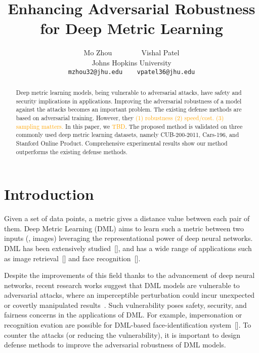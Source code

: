\documentclass[10pt,twocolumn,letterpaper]{article}
\newcommand{\oo}[1]{\textcolor{orange}{#1}}
\begin{document}
\title{Enhancing Adversarial Robustness for Deep Metric Learning}

\author{Mo Zhou ~~~~~~~ Vishal Patel\\
Johns Hopkins University\\
{\tt\small mzhou32@jhu.edu ~~ vpatel36@jhu.edu}
}
\maketitle

\begin{abstract}
	Deep metric learning models, being vulnerable to adversarial
	attacks, have safety and security implications in applications.
	Improving the adversarial robustness of a model against the attacks becomes
	an important problem.
	The existing defense methods are based on adversarial training.
	However, they \oo{(1) robustness (2) speed/cost. (3) sampling matters.}
	In this paper, we \oo{TBD}.
	The proposed method is validated on three commonly
	used deep metric learning datasets, namely CUB-200-2011, Cars-196,
	and Stanford Online Product.
	Comprehensive experimental results show our method outperforms
	the existing defense methods.
\end{abstract}

\section{Introduction}
\label{sec:1}


Given a set of data points, a metric gives a distance value between each pair
of them.
%
Deep Metric Learning (DML) aims to learn such a metric between two inputs (\eg,
images) leveraging the representational power of deep neural networks.
%
DML has been extensively studied~[], and has a wide range of applications such
as image retrieval~[] and face recognition~[].


Despite the improvements of this field thanks to the advancement of deep neural
networks, recent research works suggest that DML models are vulnerable to
adversarial attacks, where an imperceptible perturbation could incur unexpected
or covertly manipulated results~\cite{advrank}.
%
Such vulnerability poses safety, security, and fairness concerns in the
applications of DML.
%
For example, impersonation or recognition evation are possible for DML-based
face-identification system~[].
%
To counter the attacks (or reducing the vulnerability), it is important to
design defense methods to improve the adversarial robustness of DML models.
\end{document}
